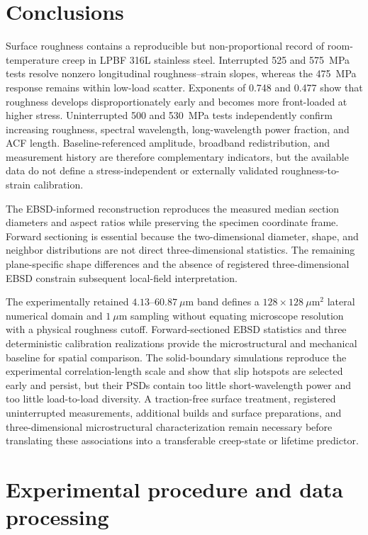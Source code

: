 \documentclass[final,12pt]{cas-sc}
\begin{document}
\section{Conclusions}

Surface roughness contains a reproducible but non-proportional record of
room-temperature creep in LPBF 316L stainless steel. Interrupted 525 and
575~MPa tests resolve nonzero longitudinal roughness--strain slopes, whereas
the 475~MPa response remains within low-load scatter. Exponents of 0.748 and
0.477 show that roughness develops disproportionately early and becomes more
front-loaded at higher stress. Uninterrupted 500 and 530~MPa tests
independently confirm increasing roughness, spectral wavelength,
long-wavelength power fraction, and ACF length. Baseline-referenced amplitude,
broadband redistribution, and measurement history are therefore
complementary indicators, but the available data do not define a
stress-independent or externally validated roughness-to-strain calibration.

The EBSD-informed reconstruction reproduces the measured median section
diameters and aspect ratios while preserving the specimen coordinate frame.
Forward sectioning is essential because the two-dimensional diameter, shape,
and neighbor distributions are not direct three-dimensional statistics. The
remaining plane-specific shape differences and the absence of registered
three-dimensional EBSD constrain subsequent local-field interpretation.

The experimentally retained $4.13$--$60.87~\mu$m band defines a
$128\times128~\mu\mathrm{m}^2$ lateral numerical domain and $1~\mu$m sampling
without equating microscope resolution with a physical roughness cutoff.
Forward-sectioned EBSD statistics and three deterministic calibration
realizations provide the microstructural and mechanical baseline for spatial
comparison. The solid-boundary simulations reproduce the experimental
correlation-length scale and show that slip hotspots are selected early and
persist, but their PSDs contain too little short-wavelength power and too
little load-to-load diversity. A traction-free surface treatment, registered uninterrupted
measurements, additional builds and surface preparations, and
three-dimensional microstructural characterization remain necessary before
translating these associations into a transferable creep-state or lifetime
predictor.

\appendix

\section{Experimental procedure and data processing}
\label{app:experimental_processing}
\end{document}
